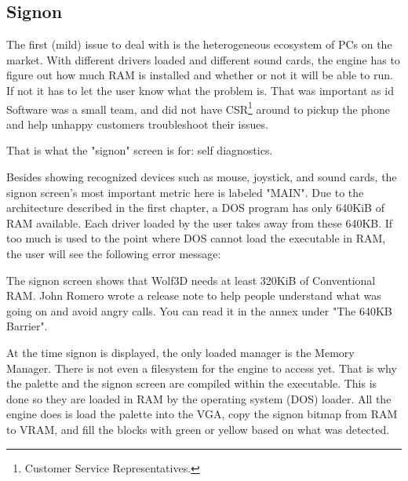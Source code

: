 \documentclass[book.tex]{subfiles}
\begin{document}
\subsection{Signon}
The first (mild) issue to deal with is the heterogeneous ecosystem of PCs on the market. With different drivers loaded and different sound cards, the engine has to figure out how much RAM is installed and whether or not it will be able to run. If not it has to let the user know what the problem is. That was important as id Software was a small team, and did not have CSR\footnote{Customer Service Representatives.} around to pickup the phone and help unhappy customers troubleshoot their issues.\\
\par
That is what the "signon" screen is for: self diagnostics. 
\par
\begin{figure}[H]
\centering
{}
\end{figure}
\par
Besides showing recognized devices such as mouse, joystick, and sound cards, the signon screen's most important metric here is labeled "MAIN". Due to the architecture described in the first chapter, a DOS program has only 640KiB of RAM available. Each driver loaded by the user takes away from these 640KB. If too much is used to the point where DOS cannot load the executable in RAM, the user will see the following error message:\\
\par 
\begin{minipage}{\textwidth}

\end{minipage}
\par
The signon screen shows that Wolf3D needs at least 320KiB of Conventional RAM. John Romero wrote a release note to help people understand what was going on and avoid angry calls. You can read it in the annex under "The 640KB Barrier".\\
\par 
At the time signon is displayed, the only loaded manager is the Memory Manager. There is not even a filesystem for the engine to access yet. That is why the palette and the signon screen are compiled within the executable. This is done so they are loaded in RAM by the operating system (DOS) loader. All the engine does is load the palette into the VGA, copy the signon bitmap from RAM to VRAM, and fill the blocks with green or yellow based on what was detected.\\
\end{document}
